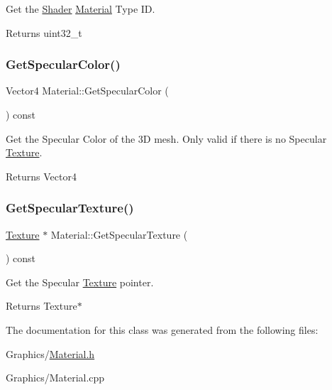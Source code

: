 Get the \hyperlink{classShader}{Shader} \hyperlink{classMaterial}{Material} Type ID. 

\begin{DoxyReturn}{Returns}
uint32\+\_\+t 
\end{DoxyReturn}
\mbox{\label{classMaterial_af730a062421aa6a8cb85f24e6b7074da}} 
\subsubsection{\texorpdfstring{Get\+Specular\+Color()}{GetSpecularColor()}}
{\footnotesize\ttfamily Vector4 Material\+::\+Get\+Specular\+Color (\begin{DoxyParamCaption}{ }\end{DoxyParamCaption}) const}



Get the Specular Color of the 3D mesh. Only valid if there is no Specular \hyperlink{classTexture}{Texture}. 

\begin{DoxyReturn}{Returns}
Vector4 
\end{DoxyReturn}
\mbox{\label{classMaterial_a0d3d4ef96719146ae94a36500f603a35}} 
\subsubsection{\texorpdfstring{Get\+Specular\+Texture()}{GetSpecularTexture()}}
{\footnotesize\ttfamily \hyperlink{classTexture}{Texture} $\ast$ Material\+::\+Get\+Specular\+Texture (\begin{DoxyParamCaption}{ }\end{DoxyParamCaption}) const}



Get the Specular \hyperlink{classTexture}{Texture} pointer. 

\begin{DoxyReturn}{Returns}
Texture$\ast$ 
\end{DoxyReturn}


The documentation for this class was generated from the following files\+:\begin{DoxyCompactItemize}
\item 
Graphics/\hyperlink{Material_8h}{Material.\+h}\item 
Graphics/Material.\+cpp\end{DoxyCompactItemize}

